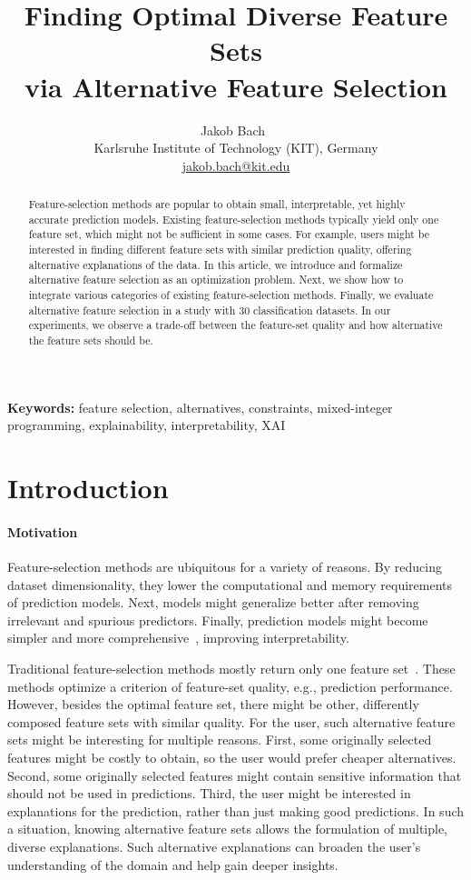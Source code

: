 \documentclass{article}
\title{
	Finding Optimal Diverse Feature Sets\\
	via Alternative Feature Selection
}
\author{
	Jakob Bach~\orcidlink{0000-0003-0301-2798}\\
	\small Karlsruhe Institute of Technology (KIT), Germany\\
	\small \href{mailto:jakob.bach@kit.edu}{jakob.bach@kit.edu}
}
\date{} %
\theoremstyle{definition}
\begin{document}
\maketitle

\begin{abstract}
Feature-selection methods are popular to obtain small, interpretable, yet highly accurate prediction models.
Existing feature-selection methods typically yield only one feature set, which might not be sufficient in some cases.
For example, users might be interested in finding different feature sets with similar prediction quality, offering alternative explanations of the data.
In this article, we introduce and formalize alternative feature selection as an optimization problem.
Next, we show how to integrate various categories of existing feature-selection methods.
Finally, we evaluate alternative feature selection in a study with 30 classification datasets.
In our experiments, we observe a trade-off between the feature-set quality and how alternative the feature sets should be.
\end{abstract}
%
\textbf{Keywords:} feature selection, alternatives, constraints, mixed-integer programming, explainability, interpretability, XAI

\section{Introduction}
\label{sec:afs:introduction}

\paragraph{Motivation}

Feature-selection methods are ubiquitous for a variety of reasons.
By reducing dataset dimensionality, they lower the computational and memory requirements of prediction models.
Next, models might generalize better after removing irrelevant and spurious predictors.
Finally, prediction models might become simpler and more comprehensive~\cite{li2017feature}, improving interpretability.

Traditional feature-selection methods mostly return only one feature set~\cite{borboudakis2021extending}.
These methods optimize a criterion of feature-set quality, e.g., prediction performance.
However, besides the optimal feature set, there might be other, differently composed feature sets with similar quality.
For the user, such alternative feature sets might be interesting for multiple reasons.
First, some originally selected features might be costly to obtain, so the user would prefer cheaper alternatives.
Second, some originally selected features might contain sensitive information that should not be used in predictions.
Third, the user might be interested in explanations for the prediction, rather than just making good predictions.
In such a situation, knowing alternative feature sets allows the formulation of multiple, diverse explanations.
Such alternative explanations can broaden the user's understanding of the domain and help gain deeper insights.
\end{document}
